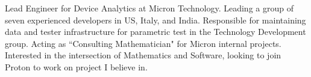 

\begin{cvparagraph}

\vspace{1mm}Lead Engineer for Device Analytics at Micron Technology. Leading a group of seven experienced developers in US, Italy, and India. Responsible for maintaining data and tester infrastructure for parametric test in the Technology Development group. Acting as ``Consulting Mathematician" for Micron internal projects. Interested in the intersection of Mathematics and Software, looking to join Proton to work on project I believe in.
\end{cvparagraph}

